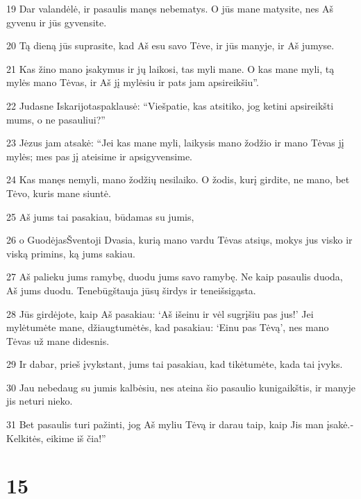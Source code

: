 \par 19 Dar valandėlė, ir pasaulis manęs nebematys. O jūs mane matysite, nes Aš gyvenu ir jūs gyvensite. 
\par 20 Tą dieną jūs suprasite, kad Aš esu savo Tėve, ir jūs manyje, ir Aš jumyse. 
\par 21 Kas žino mano įsakymus ir jų laikosi, tas myli mane. O kas mane myli, tą mylės mano Tėvas, ir Aš jį mylėsiu ir pats jam apsireikšiu”. 
\par 22 Judas­ne Iskarijotas­paklausė: “Viešpatie, kas atsitiko, jog ketini apsireikšti mums, o ne pasauliui?” 
\par 23 Jėzus jam atsakė: “Jei kas mane myli, laikysis mano žodžio ir mano Tėvas jį mylės; mes pas jį ateisime ir apsigyvensime. 
\par 24 Kas manęs nemyli, mano žodžių nesilaiko. O žodis, kurį girdite, ne mano, bet Tėvo, kuris mane siuntė. 
\par 25 Aš jums tai pasakiau, būdamas su jumis, 
\par 26 o Guodėjas­Šventoji Dvasia, kurią mano vardu Tėvas atsiųs,­ mokys jus visko ir viską primins, ką jums sakiau. 
\par 27 Aš palieku jums ramybę, duodu jums savo ramybę. Ne kaip pasaulis duoda, Aš jums duodu. Tenebūgštauja jūsų širdys ir teneišsigąsta. 
\par 28 Jūs girdėjote, kaip Aš pasakiau: ‘Aš išeinu ir vėl sugrįšiu pas jus!’ Jei mylėtumėte mane, džiaugtumėtės, kad pasakiau: ‘Einu pas Tėvą’, nes mano Tėvas už mane didesnis. 
\par 29 Ir dabar, prieš įvykstant, jums tai pasakiau, kad tikėtumėte, kada tai įvyks. 
\par 30 Jau nebedaug su jumis kalbėsiu, nes ateina šio pasaulio kunigaikštis, ir manyje jis neturi nieko. 
\par 31 Bet pasaulis turi pažinti, jog Aš myliu Tėvą ir darau taip, kaip Jis man įsakė.­Kelkitės, eikime iš čia!”


\chapter{15}


